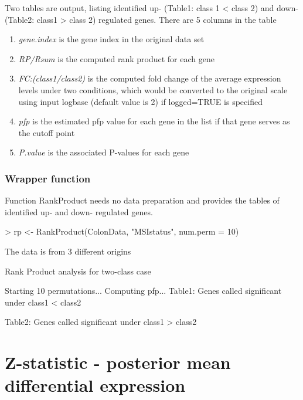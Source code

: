 \documentclass[a4paper]{report}
\begin{document}
Two tables are output, listing identified up- (Table1: class 1 < class 2) and down- (Table2: class1 > class 2) regulated genes. There are 5 columns in the table 
\begin{enumerate}
\item \emph{gene.index} is the gene index in the original data set
\item \emph{RP/Rsum} is the computed rank product for each gene
\item \emph{FC:(class1/class2)} is the computed fold change of the average expression levels under two conditions, which would be converted to the original scale using input logbase (default value is 2) if {\ttfamily logged=TRUE} is specified
\item \emph{pfp} is the estimated pfp value for each gene in the list if that gene serves as the cutoff point
\item \emph{P.value} is the associated P-values for each gene
\end{enumerate}

\subsection*{Wrapper function}
Function {\ttfamily RankProduct} needs no data preparation and provides the tables of identified up- and down- regulated genes.
\begin{Schunk}
\begin{Sinput}
> rp <- RankProduct(ColonData, "MSIstatus", num.perm = 10)
\end{Sinput}
\begin{Soutput}
 The data is from  3 different origins 
 
Rank Product analysis for two-class case 
 
Starting  10 permutations... 
Computing pfp... 
Table1: Genes called significant under class1 < class2 

Table2: Genes called significant under class1 > class2 
\end{Soutput}
\end{Schunk}

\chapter{Z-statistic - posterior mean differential expression}
\end{document}
